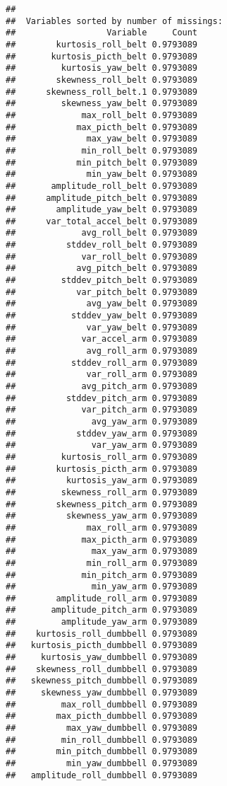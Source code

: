 \documentclass[]{article}
\begin{document}
\begin{verbatim}
## 
##  Variables sorted by number of missings: 
##                  Variable     Count
##        kurtosis_roll_belt 0.9793089
##       kurtosis_picth_belt 0.9793089
##         kurtosis_yaw_belt 0.9793089
##        skewness_roll_belt 0.9793089
##      skewness_roll_belt.1 0.9793089
##         skewness_yaw_belt 0.9793089
##             max_roll_belt 0.9793089
##            max_picth_belt 0.9793089
##              max_yaw_belt 0.9793089
##             min_roll_belt 0.9793089
##            min_pitch_belt 0.9793089
##              min_yaw_belt 0.9793089
##       amplitude_roll_belt 0.9793089
##      amplitude_pitch_belt 0.9793089
##        amplitude_yaw_belt 0.9793089
##      var_total_accel_belt 0.9793089
##             avg_roll_belt 0.9793089
##          stddev_roll_belt 0.9793089
##             var_roll_belt 0.9793089
##            avg_pitch_belt 0.9793089
##         stddev_pitch_belt 0.9793089
##            var_pitch_belt 0.9793089
##              avg_yaw_belt 0.9793089
##           stddev_yaw_belt 0.9793089
##              var_yaw_belt 0.9793089
##             var_accel_arm 0.9793089
##              avg_roll_arm 0.9793089
##           stddev_roll_arm 0.9793089
##              var_roll_arm 0.9793089
##             avg_pitch_arm 0.9793089
##          stddev_pitch_arm 0.9793089
##             var_pitch_arm 0.9793089
##               avg_yaw_arm 0.9793089
##            stddev_yaw_arm 0.9793089
##               var_yaw_arm 0.9793089
##         kurtosis_roll_arm 0.9793089
##        kurtosis_picth_arm 0.9793089
##          kurtosis_yaw_arm 0.9793089
##         skewness_roll_arm 0.9793089
##        skewness_pitch_arm 0.9793089
##          skewness_yaw_arm 0.9793089
##              max_roll_arm 0.9793089
##             max_picth_arm 0.9793089
##               max_yaw_arm 0.9793089
##              min_roll_arm 0.9793089
##             min_pitch_arm 0.9793089
##               min_yaw_arm 0.9793089
##        amplitude_roll_arm 0.9793089
##       amplitude_pitch_arm 0.9793089
##         amplitude_yaw_arm 0.9793089
##    kurtosis_roll_dumbbell 0.9793089
##   kurtosis_picth_dumbbell 0.9793089
##     kurtosis_yaw_dumbbell 0.9793089
##    skewness_roll_dumbbell 0.9793089
##   skewness_pitch_dumbbell 0.9793089
##     skewness_yaw_dumbbell 0.9793089
##         max_roll_dumbbell 0.9793089
##        max_picth_dumbbell 0.9793089
##          max_yaw_dumbbell 0.9793089
##         min_roll_dumbbell 0.9793089
##        min_pitch_dumbbell 0.9793089
##          min_yaw_dumbbell 0.9793089
##   amplitude_roll_dumbbell 0.9793089

\end{verbatim}
\end{document}
